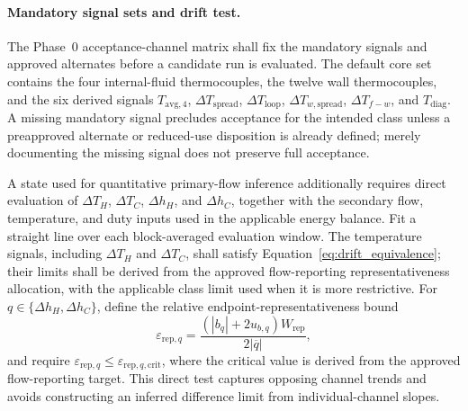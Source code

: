 \documentclass[11pt]{article}
\newcommand{\Tavg}{T_{\mathrm{avg},4}}
\newcommand{\Tdiag}{T_{\mathrm{diag}}}
\begin{document}
\paragraph{Mandatory signal sets and drift test.}
The Phase~0 acceptance-channel matrix shall fix the mandatory signals and approved alternates before a candidate run is evaluated. The default core set contains the four internal-fluid thermocouples, the twelve wall thermocouples, and the six derived signals $\Tavg$, $\Delta T_{\mathrm{spread}}$, $\Delta T_{\mathrm{loop}}$, $\Delta T_{w,\mathrm{spread}}$, $\Delta T_{f-w}$, and $\Tdiag$. A missing mandatory signal precludes acceptance for the intended class unless a preapproved alternate or reduced-use disposition is already defined; merely documenting the missing signal does not preserve full acceptance.

A state used for quantitative primary-flow inference additionally requires direct evaluation of $\Delta T_H$, $\Delta T_C$, $\Delta h_H$, and $\Delta h_C$, together with the secondary flow, temperature, and duty inputs used in the applicable energy balance. Fit a straight line over each block-averaged evaluation window. The temperature signals, including $\Delta T_H$ and $\Delta T_C$, shall satisfy Equation~\eqref{eq:drift_equivalence}; their limits shall be derived from the approved flow-reporting representativeness allocation, with the applicable class limit used when it is more restrictive. For $q\in\{\Delta h_H,\Delta h_C\}$, define the relative endpoint-representativeness bound
\begin{equation}
    \varepsilon_{\mathrm{rep},q}
    =
    \frac{\left(|b_q|+2u_{b,q}\right)W_{\mathrm{rep}}}
    {2|\overline q|},
    \label{eq:enthalpy_representativeness}
\end{equation}
and require $\varepsilon_{\mathrm{rep},q}\leq\varepsilon_{\mathrm{rep},q,\mathrm{crit}}$, where the critical value is derived from the approved flow-reporting target. This direct test captures opposing channel trends and avoids constructing an inferred difference limit from individual-channel slopes.
\end{document}
